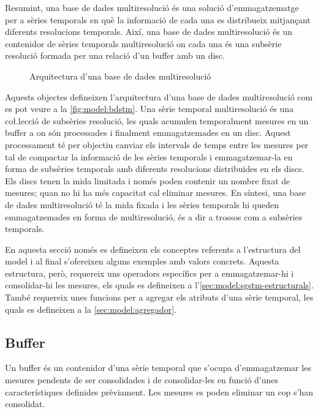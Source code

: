 Resumint, una base de dades multiresolució és una solució
d'emmagatzematge per a sèries temporals en què la informació de cada
una es distribueix mitjançant diferents resolucions temporals.  Així,
una base de dades multiresolució és un contenidor de sèries temporals
multiresolució on cada una és una subsèrie resolució formada per una
relació d'un buffer amb un disc.

\begin{figure}[tp]
\centering

\caption{Arquitectura d'una base de dades multiresolució}
\label{fig:model:bdstm}
\end{figure}




Aquests objectes defineixen l'arquitectura d'una base de dades
multiresolució com es pot veure a la \autoref{fig:model:bdstm}.  Una
sèrie temporal multiresolució és una co\l.lecció de subsèries
resolució, les quals acumulen temporalment mesures en un buffer a on
són processades i finalment emmagatzemades en un disc. Aquest
processament té per objectiu canviar els intervals de temps entre les
mesures per tal de compactar la informació de les sèries temporals i
emmagatzemar-la en forma de subsèries temporals amb diferents
resolucions distribuïdes en els discs. Els discs tenen la mida
limitada i només poden contenir un nombre fixat de mesures; quan no hi
ha més capacitat cal eliminar mesures.  En síntesi, una base de dades
multiresolució té la mida fixada i les sèries temporals hi queden
emmagatzemades en forma de multiresolució, és a dir a trossos com a
subsèries temporals.


En aquesta secció només es defineixen els conceptes referents a
l'estructura del model i al final s'ofereixen alguns exemples amb
valors concrets. Aquesta estructura, però, requereix uns operadors
específics per a emmagatzemar-hi i consolidar-hi les mesures, els
quals es defineixen a
l'\autoref{sec:model:sgstm-estructurals}. També requereix unes
funcions per a agregar els atributs d'una sèrie temporal, les quals
es defineixen a la \autoref{sec:model:agregador}.




\subsection{Buffer}\label{sec:model:buffer}



Un buffer és un contenidor d'una sèrie temporal que s'ocupa
d'emmagatzemar les mesures pendents de ser consolidades i de
consolidar-les en funció d'unes característiques definides
prèviament. Les mesures es poden eliminar un cop s'han consolidat.

